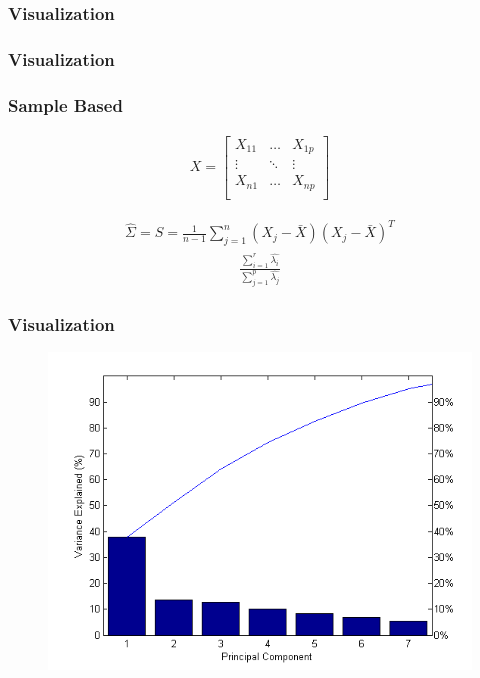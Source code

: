 \documentclass[aspectratio=169,10pt,t]{beamer}
\begin{document}
\begin{frame}[t]
	\frametitle{Visualization}

	\begin{figure}[H]
		\centering
		\scalebox{0.7}{
			
		}
	\end{figure}



\end{frame}
\begin{frame}[t]
	\frametitle{Visualization}
	\begin{figure}[H]
		\centering
		\scalebox{0.7}{
			
		}
	\end{figure}

\end{frame}

\begin{frame}[t]
	\frametitle{Sample Based}

	\begin{align*}
		X = \begin{bmatrix}
			X_{11} & \hdots & X_{1p} \\
			\vdots &  \ddots & \vdots  \\
			X_{n1} & \hdots & X_{np} \\
		\end{bmatrix}
	\end{align*}

	\begin{align*}
		\hat{\Sigma} = S = \frac{1}{n-1} \sum^{n}_{j=1} (X_j - \bar{X} )(X_j - \bar{X} )^T
	\end{align*}
	\begin{align*}
		\frac{ \sum^{r}_{i=1} \hat{\lambda_i}  }{ \sum^{p}_{j=1} \hat{\lambda_j}  }
	\end{align*}



\end{frame}

\begin{frame}[t]
	\frametitle{Visualization}
	\begin{figure}[h]
		\centering
		\includegraphics[width=0.65\linewidth]{images/Pareto_chart_of_titanium_investment_casting_defects.svg.png}
	\end{figure}

\end{frame}
\end{document}
